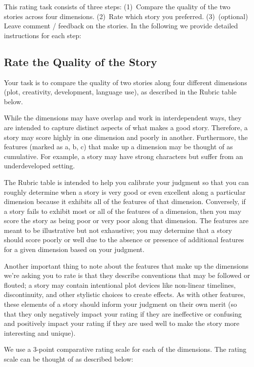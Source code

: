 \documentclass{article}
\begin{document}
This rating task consists of three steps: (1)~Compare the quality of the two stories across four dimensions. (2)~Rate which story you preferred. (3)~(optional)  Leave comment / feedback on the stories.
In the following we provide detailed instructions for each step: 

\subsection{Rate the Quality of the Story}
Your task is to compare the quality of two stories along four different dimensions (plot, creativity, development, language use), as described in the Rubric table below. 

While the dimensions may have overlap and work in interdependent ways, they are intended to capture distinct aspects of what makes a good story. Therefore, a story may score highly in one dimension and poorly in another. Furthermore, the features (marked as a, b, c) that make up a dimension may be thought of as cumulative. For example, a story may have strong characters but suffer from an underdeveloped setting. 

The Rubric table is intended to help you calibrate your judgment so that you can roughly determine when a story is very good or even excellent along a particular dimension because it exhibits all of the features of that dimension. Conversely, if a story fails to exhibit most or all of the features of a dimension, then you may score the story as being poor or very poor along that dimension. The features are meant to be illustrative but not exhaustive; you may determine that a story should score poorly or well due to the absence or presence of additional features for a given dimension based on your judgment.

Another important thing to note about the features that make up the dimensions we’re asking you to rate is that they describe conventions that may be followed or flouted; a story may contain intentional plot devices like non-linear timelines, discontinuity, and other stylistic choices to create effects. As with other features, these elements of a story should inform your judgment on their own merit (so that they only negatively impact your rating if they are ineffective or confusing and positively impact your rating if they are used well to make the story more interesting and unique). 



We use a 3-point comparative rating scale for each of the dimensions. The rating scale can be thought of as described below:
\end{document}
